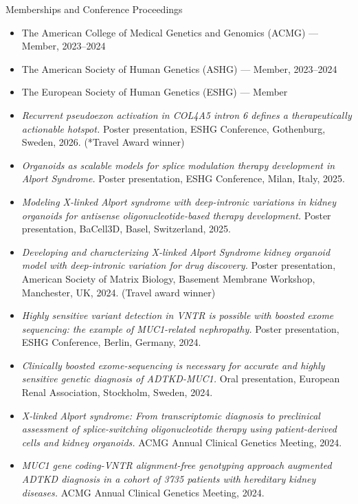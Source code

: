 \documentclass[
	11pt, %
]{resume} %
\begin{document}

\begin{rSection}{Memberships and Conference Proceedings}
\begin{itemize}
  \item The American College of Medical Genetics and Genomics (ACMG) — Member, 2023–2024
  \item The American Society of Human Genetics (ASHG) — Member, 2023–2024
  \item The European Society of Human Genetics (ESHG) — Member
  \item \textit{Recurrent pseudoexon activation in COL4A5 intron 6 defines a therapeutically actionable hotspot.} Poster presentation, ESHG Conference, Gothenburg, Sweden, 2026. (*Travel Award winner)
  \item \textit{Organoids as scalable models for splice modulation therapy development in Alport Syndrome.} Poster presentation, ESHG Conference, Milan, Italy, 2025.
  \item \textit{Modeling X-linked Alport syndrome with deep-intronic variations in kidney organoids for antisense oligonucleotide-based therapy development.} Poster presentation, BaCell3D, Basel, Switzerland, 2025.
  \item \textit{Developing and characterizing X-linked Alport Syndrome kidney organoid model with deep-intronic variation for drug discovery.} Poster presentation, American Society of Matrix Biology, Basement Membrane Workshop, Manchester, UK, 2024. (Travel award winner)
  \item \textit{Highly sensitive variant detection in VNTR is possible with boosted exome sequencing: the example of MUC1-related nephropathy.} Poster presentation, ESHG Conference, Berlin, Germany, 2024.
  \item \textit{Clinically boosted exome-sequencing is necessary for accurate and highly sensitive genetic diagnosis of ADTKD-MUC1.} Oral presentation, European Renal Association, Stockholm, Sweden, 2024.
  \item \textit{X-linked Alport syndrome: From transcriptomic diagnosis to preclinical assessment of splice-switching oligonucleotide therapy using patient-derived cells and kidney organoids.} ACMG Annual Clinical Genetics Meeting, 2024.
  \item \textit{MUC1 gene coding-VNTR alignment-free genotyping approach augmented ADTKD diagnosis in a cohort of 3735 patients with hereditary kidney diseases.} ACMG Annual Clinical Genetics Meeting, 2024.

\end{itemize}
\end{rSection}
\end{document}
